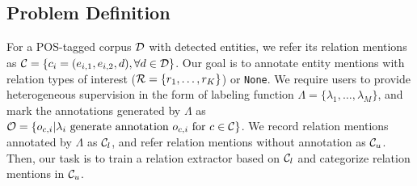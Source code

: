 
\subsection{Problem Definition}
\label{subsec:pd}
For a POS-tagged corpus $\mathcal{D}$ with detected entities, we refer its relation mentions as $\mathcal{C} = \{c_i = (e_{i,1}, e_{i,2}, d), \forall d \in \mathcal{D}\}$. 
Our goal is to annotate entity mentions with relation types of interest ($\mathcal{R} = \{r_1, \dots, r_K\}$) or \texttt{None}. 
We require users to provide heterogeneous supervision in the form of labeling function $\Lambda = \{\lambda_1, \dots, \lambda_M\}$, and mark the annotations generated by $\Lambda$ as $\mathcal{O} = \{o_{c, i} | \lambda_i \text{ generate annotation }o_{c, i} \text{ for }c \in \mathcal{C}\}$. 
We record relation mentions annotated by $\Lambda$ as $\mathcal{C}_l$, and refer relation mentions without annotation as $\mathcal{C}_u$. 
Then, our task is to train a relation extractor based on $\mathcal{C}_l$ and categorize relation mentions in $\mathcal{C}_u$.